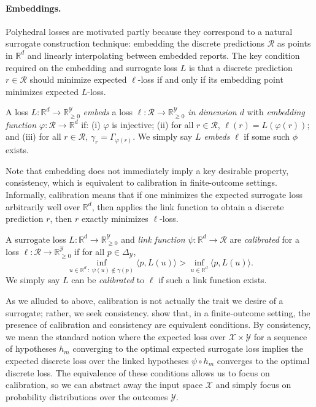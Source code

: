 \documentclass[anon]{colt2020} %
\newcommand{\reals}{\mathbb{R}}
\newcommand{\nonnegreals}{\reals_{\geq 0}}%
\newcommand{\simplex}{\Delta_\Y}
\newcommand{\R}{\mathcal{R}}
\newcommand{\X}{\mathcal{X}}
\newcommand{\Y}{\mathcal{Y}}
\newcommand{\inprod}[2]{\langle #1, #2 \rangle}%
\begin{document}
\paragraph{Embeddings.}
Polyhedral losses are motivated partly because they correspond to a natural surrogate construction technique: embedding the discrete predictions $\R$ as points in $\reals^d$ and linearly interpolating between embedded reports.
The key condition required on the embedding and surrogate loss $L$ is that a discrete prediction $r \in \R$ should minimize expected $\ell$-loss if and only if its embedding point minimizes expected $L$-loss.
%
\begin{definition}
  A loss $L: \reals^d \to \nonnegreals^{\Y}$ \emph{embeds} a loss $\ell: \R \to \nonnegreals^{\Y}$ \emph{in dimension $d$} with \emph{embedding function $\varphi: \R \to \reals^d$} if: (i) $\varphi$ is injective; (ii) for all $r \in \R$, $\ell(r) = L(\varphi(r))$; and (iii) for all $r \in \R$, $\gamma_r = \Gamma_{\varphi(r)}$.
  We simply say $L$ \emph{embeds} $\ell$ if some such $\phi$ exists.
\end{definition}
%
Note that embedding does not immediately imply a key desirable property, consistency, which is equivalent to calibration in finite-outcome settings.
Informally, calibration means that if one minimizes the expected surrogate loss arbitrarily well over $\reals^d$, then applies the link function to obtain a discrete prediction $r$, then $r$ exactly minimizes $\ell$-loss.
\begin{definition}\label{def:calibration}
  A surrogate loss $L: \reals^d \to \nonnegreals^{\Y}$ and \emph{link function} $\psi: \reals^d \to \R$ are \emph{calibrated} for a loss $\ell: \R \to \nonnegreals^{\Y}$ if for all $p \in \simplex$,
    \[ \inf_{u \in \reals^d ~:~ \psi(u) \not\in \gamma(p)} \inprod{p}{L(u)}  > \inf_{u \in \reals^d} \inprod{p}{L(u)}  .\]
  We simply say $L$ can be \emph{calibrated} to $\ell$ if such a link function exists.
\end{definition}
As we alluded to above, calibration is not actually the trait we desire of a surrogate; rather, we seek consistency.
\cite{tewari2007consistency} show that, in a finite-outcome setting, the presence of calibration and consistency are equivalent conditions.
By consistency, we mean the standard notion where the expected loss over $\X \times \Y$ for a sequence of hypotheses $h_m$ converging to the optimal expected surrogate loss implies the expected discrete loss over the linked hypotheses $\psi \circ h_m$ converges to the optimal discrete loss.
The equivalence of these conditions allows us to focus on calibration, so we can abstract away the input space $\X$ and simply focus on probability distributions over the outcomes $\Y$.
\end{document}
